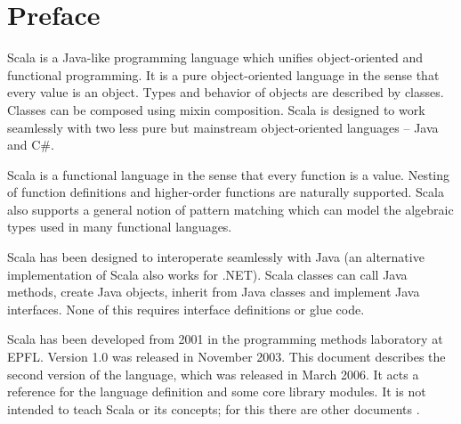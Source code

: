 
\renewcommand{\todo}[1]{}
\newcommand{\notyet}[1]{\footnote{#1 not yet implemented.}}
\newcommand{\Ts}{\mbox{\sl Ts}}
\newcommand{\tps}{\mbox{\sl tps}}
\newcommand{\ps}{\mbox{\sl ps}}
\newcommand{\ds}{\mbox{\sl ds}}
\newcommand{\xs}{\mbox{\sl xs}}
\newcommand{\psig}{\mbox{\sl psig}}
\newcommand{\fsig}{\mbox{\sl fsig}}
\newcommand{\csig}{\mbox{\sl csig}}
\newcommand{\args}{\mbox{\sl args}}
\newcommand{\targs}{\mbox{\sl targs}}
\newcommand{\enums}{\mbox{\sl enums}}
\newcommand{\proto}{\mbox{\sl pt}}
\newcommand{\argtypes}{\mbox{\sl Ts}}
\newcommand{\stats}{\mbox{\sl stats}}
\newcommand{\overload}{\la\mbox{\sf and}\ra}
\newcommand{\op}{\mbox{\sl op}}

\newcommand{\eqdef}{\stackrel{\mbox{\small eq}}{=}}
\newcommand{\ifqualified}[1]{}
\newcommand{\iflet}[1]{}
\newcommand{\ifundefvar}[1]{}
\newcommand{\iffinaltype}[1]{}
\newcommand{\ifpackaging}[1]{}
\newcommand{\ifnewfor}[1]{}

\newcommand{\U}[1]{\mbox{$\backslash$u{#1}}}
\newcommand{\Urange}[2]{\mbox{$\backslash$u{#1}-$\backslash$u{#2}}}

\section*{Preface}

Scala is a Java-like programming language which unifies
object-oriented and functional programming.  It is a pure
object-oriented language in the sense that every value is an
object. Types and behavior of objects are described by
classes. Classes can be composed using mixin composition.  Scala is
designed to work seamlessly with two less pure but mainstream
object-oriented languages -- Java and C\#.

Scala is a functional language in the sense that every function is a
value. Nesting of function definitions and higher-order functions are
naturally supported. Scala also supports a general notion of pattern
matching which can model the algebraic types used in many functional
languages.

Scala has been designed to interoperate seamlessly with Java (an
alternative implementation of Scala also works for .NET). Scala
classes can call Java methods, create Java objects, inherit from Java
classes and implement Java interfaces. None of this requires interface
definitions or glue code.

Scala has been developed from 2001 in the programming methods
laboratory at EPFL. Version 1.0 was released in November 2003. This
document describes the second version of the language, which was
released in March 2006. It acts a reference for the language
definition and some core library modules. It is not intended to teach
Scala or its concepts; for this there are other documents 
\cite{scala-overview-tech-report,%
      odersky:scala-experiment,%
      odersky:sca,%
      odersky-et-al:ecoop03,%
      odersky-zenger:fool12}.

